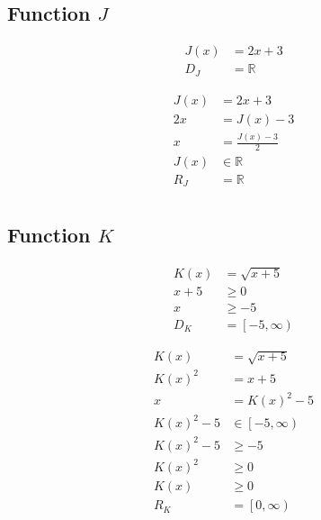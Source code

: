 \documentclass[12pt, letterpaper]{article}
\begin{document}
        \subsection{Function \(J\)}
        \vspace{-2pt}
        \begin{minipage}{0.5\textwidth}
            \begin{align*}
                J(x) &= 2x + 3 \\
                D_{J} &= \mathbb{R}
            \end{align*}
        \end{minipage}
        \begin{minipage}{0.5\textwidth}
            \begin{align*}
                J(x) &= 2x + 3 \\
                2x &= J(x) - 3 \\
                x &= \frac{J(x) - 3}{2} \\
                J(x) &\in \mathbb{R} \\
                R_{J} &= \mathbb{R} \\
            \end{align*}
        \end{minipage}

        \subsection{Function \(K\)}
        \vspace{-2pt}
        \begin{minipage}{0.5\textwidth}
            \begin{align*}
                K(x) &= \sqrt{x+5} \\
                x+5 &\geq 0 \\
                x &\geq -5 \\
                D_{K} &= \left[-5,\infty\right)
            \end{align*}
        \end{minipage}
        \begin{minipage}{0.5\textwidth}
            \begin{align*}
                K(x) &= \sqrt{x+5} \\
                K(x)^2 &= x+5 \\
                x &= K(x)^2-5 \\
                K(x)^2 - 5 &\in \left[-5,\infty\right) \\
                K(x)^2 - 5 &\geq -5 \\
                K(x)^2 &\geq 0 \\
                K(x) &\geq 0 \\
                R_{K} &= \left[0,\infty\right) \\
            \end{align*}
        \end{minipage}
\end{document}
